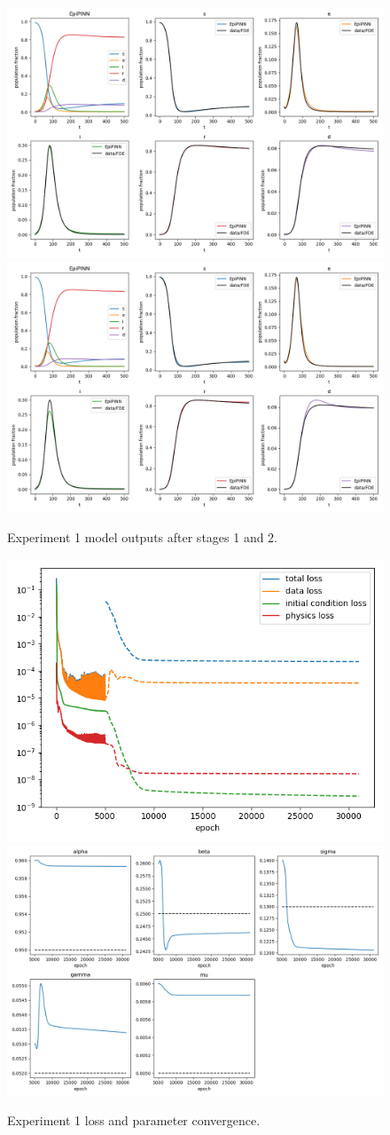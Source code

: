 \documentclass{article}
\begin{document}
	\begin{figure}
		\centering
		\includegraphics[width=0.49\linewidth]{images/experiment1_stage1.png}
		\includegraphics[width=0.49\linewidth]{images/experiment1_stage2.png}
		\caption{Experiment 1 model outputs after stages 1 and 2.}
		\label{figure:experiment1_outputs}
	\end{figure}
	
	\begin{figure}
	\centering
	\includegraphics[width=0.44\linewidth]{images/experiment1_losses.png}
	\includegraphics[width=0.49\linewidth]{images/experiment1_parameters.png}
	\caption{Experiment 1 loss and parameter convergence.}
	\label{figure:experiment1_losses}
	\end{figure}
	
\end{document}
